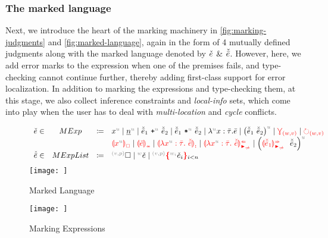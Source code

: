 \subsubsection{The marked language}
\label{sub:marked-lang}
Next, we introduce the heart of the marking machinery in \autoref{fig:marking-judgments} and \autoref{fig:marked-language}, again in the form of 4 mutually defined judgments along with the marked language denoted by $\check{e}$ \& $\check{\bar{e}}$. However, here, we add error marks to the expression when one of the premises fails, and type-checking cannot continue further, thereby adding first-class support for error localization. In addition to marking the expressions and type-checking them, at this stage, we also collect inference constraints and \emph{local-info} sets, which come into play when the user has to deal with \emph{multi-location} and \emph{cycle} conflicts.




\begin{figure}
    \[
    \begin{array}{lclll}
    \ECMV \in & MExp & \coloneqq &
        \var{x}
        \mid \num
        \mid \plus{\ELMV_1}{\ELMV_2}
        \mid \mult{\ELMV_1}{\ELMV_2}
        \mid \lam{x}{\TLMV}{\ELV}
        \mid \app{\ELMV_1}{\ELMV_2}
        \mid \multiref
        \mid \uniref \\ 
        & & & \ECFree{\var{x}} 
        \mid \incontype
        \mid \lamasc
        \mid \lamanamarr
        \mid \apsynmarr \\ 
     \ELMV \in & MExpList & \coloneqq &
        \ehole
        \mid \lexp{\ECMV}
        \mid \conflict{\ECMV} \\
    \end{array}
    \]
    \centering
    \texttt{[image: ]}
    \caption{Marked Language}
    \label{fig:marked-language}
\end{figure}

\begin{figure}
    \judgbox{\synMarkConstraint{\ctx}{\EMV}{\ECMV}{\sigma}{\cConstraint}{\mConstraint}} 
    \judgbox{\synMarkConstraint{\ctx}{\ELV}{\ELMV}{\sigma}{\cConstraint}{\mConstraint}} 
    \judgbox{\anaMarkConstraint{\ctx}{\EMV}{\ECMV}{\sigma}{\cConstraint}{\mConstraint}} 
    \judgbox{\anaMarkConstraint{\ctx}{\ELV}{\ELMV}{\sigma}{\cConstraint}{\mConstraint}} 
    \centering
    \texttt{[image: ]}
    \caption{Marking Expressions}
    \label{fig:marking-judgments}
\end{figure}

